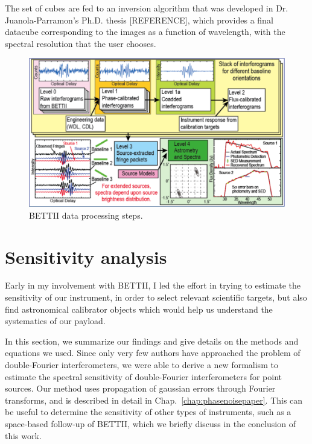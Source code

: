 The set of cubes are fed to an inversion algorithm that was developed in Dr. Juanola-Parramon's Ph.D. thesis [REFERENCE], which provides a final datacube corresponding to the images as a function of wavelength, with the spectral resolution that the user chooses. 

\begin{figure}[!h]
	\centering
	\includegraphics[width=\textwidth]{Figures/DataProcessing.png}
	\caption[Data processing]{BETTII data processing steps.}
	\label{fig:dataProcessing}
    \end{figure}




\section{Sensitivity analysis}

Early in my involvement with BETTII, I led the effort in trying to estimate the sensitivity of our instrument, in order to select relevant scientific targets, but also find astronomical calibrator objects which would help us understand the systematics of our payload.

In this section, we summarize our findings and give details on the methods and equations we used. Since only very few authors have approached the problem of double-Fourier interferometers, we were able to derive a new formalism to estimate the spectral sensitivity of double-Fourier interferometers for point sources. Our method uses propagation of gaussian errors through Fourier transforms, and is described in detail in Chap.~\ref{chap:phasenoisepaper}. This can be useful to determine the sensitivity of other types of instruments, such as a space-based follow-up of BETTII, which we briefly discuss in the conclusion of this work.

